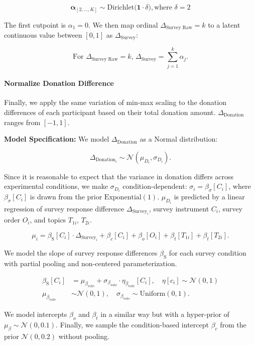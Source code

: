 \begin{equation}
    \boldsymbol{\alpha}_{[2, ...,K]} \sim \mathrm{Dirichlet}\bigl(\mathbf{1}\cdot \delta\bigr), \text{where } \delta = 2
\end{equation}

The first cutpoint is $\alpha_{1} = 0$. We then map ordinal $\Delta_{\text{Survey Raw}}=k$ to a latent continuous value between $[0,1]$ as $\Delta_{\text{Survey}}$:

\begin{equation}
    \text{For }\Delta_{\text{Survey Raw}}=k\text{, } \Delta_{\text{Survey}} = \sum_{j=1}^{k} \alpha_j.
\end{equation}

\paragraph{Normalize Donation Difference} Finally, we apply the same variation of min-max scaling to the donation differences of each participant based on their total donation amount. $\Delta_{\text{Donation}}$ ranges from $[-1, 1]$.

\textbf{Model Specification:} We model $\Delta_{\text{Donation}}$ as a Normal distribution:

\begin{equation}
    \label{eq:intensity_normal}
    \Delta_{\text{Donation}_i} \sim \mathcal{N}(\mu_{D_i}, \sigma_{D_i}).
\end{equation}

Since it is reasonable to expect that the variance in donation differs across experimental conditions, we make 
$\sigma_{D_i}$ condition-dependent: $\sigma_i=\beta_{\sigma}[C_i]$, where $\beta_{\sigma}[C_i]$ is drawn from the prior $\mathrm{Exponential}(1)$. $\mu_{D_i}$ is predicted by a linear regression of survey response difference $\Delta_{\text{Survey}_i}$, survey instrument $C_i$, survey order $O_i$, and topics $T_{1i}$, $T_{2i}$. 

\begin{equation}
    \label{eq:intensity_linpred}
    \mu_i
    =
    \beta_{\text{S}}[C_i] \cdot \Delta_{\text{Survey}_i}
    +
    \beta_{c}[C_i]
    +
    \beta_{o}[O_i]
    +
    \beta_{t}[T_{1i}]
    +
    \beta_{t}[T_{2i}].
\end{equation}

We model the slope of survey response differences $\beta_{\text{S}}$ for each survey condition with partial pooling and non-centered parameterization.

\begin{align}
    \beta_{\text{S}}[C_i]
    &=
    \mu_{\beta_{\text{vote}}}
    + \sigma_{\beta_{\text{vote}}} \cdot \eta_{\beta_{\text{vote}}}[C_i],
    \quad \eta[c_i] \sim \mathcal{N}(0, 1) \\
    \mu_{\beta_{\text{vote}}}
    &\sim
    \mathcal{N}(0,1),
    \quad
    \sigma_{\beta_{\text{vote}}}
    \sim
    \mathrm{Uniform}(0,1).
\end{align}

We model intercepts $\beta_{o}$ and $\beta_{t}$ in a similar way but with a hyper-prior of $\mu_{\beta} \sim \mathcal{N}(0,0.1)$. Finally, we sample the condition-based intercept $\beta_{c}$ from the prior $\mathcal{N}(0,0.2)$ without pooling. 
